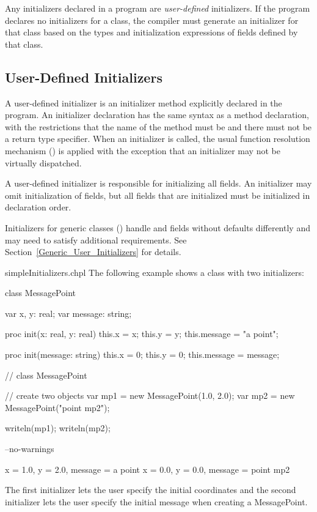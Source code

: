 Any initializers declared in a program are \emph{user-defined} initializers. If
the program declares no initializers for a class, the compiler must generate an
initializer for that class based on the types and initialization expressions of
fields defined by that class.

\subsection{User-Defined Initializers}
\label{User_Defined_Initializers}

A user-defined initializer is an initializer method explicitly declared in the
program.  An initializer declaration has the same syntax as a method
declaration, with the restrictions that the name of the method must be
 and there must not be a return type specifier. When an initializer
is called, the usual function resolution mechanism ()
is applied with the exception that an initializer may not be virtually
dispatched.

A user-defined initializer is responsible for initializing all fields. An
initializer may omit initialization of fields, but all fields that are
initialized must be initialized in declaration order.

Initializers for generic classes () handle  and
 fields without defaults differently and may need to satisfy
additional requirements. See Section~\ref{Generic_User_Initializers} for
details.

\begin{chapelexample}{simpleInitializers.chpl}
The following example shows a class with two initializers:
\begin{chapel}
class MessagePoint {
  var x, y: real;
  var message: string;

  proc init(x: real, y: real) {
    this.x = x;
    this.y = y;
    this.message = "a point";
  }

  proc init(message: string) {
    this.x = 0;
    this.y = 0;
    this.message = message;
  }
}  // class MessagePoint

// create two objects
var mp1 = new MessagePoint(1.0, 2.0);
var mp2 = new MessagePoint("point mp2");
\end{chapel}
\begin{chapelpost}
writeln(mp1);
writeln(mp2);
\end{chapelpost}
\begin{chapelcompopts}
--no-warnings
\end{chapelcompopts}
\begin{chapeloutput}
{x = 1.0, y = 2.0, message = a point}
{x = 0.0, y = 0.0, message = point mp2}
\end{chapeloutput}
The first initializer lets the user specify the initial coordinates
and the second initializer lets the user specify the initial message
when creating a MessagePoint.
\end{chapelexample}

